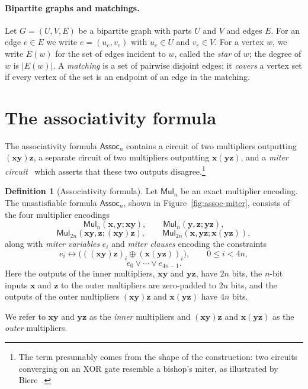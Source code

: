 \documentclass[11pt]{article}
\theoremstyle{definition}
\newtheorem{definition}[theorem]{Definition}
\theoremstyle{remark}
\newcommand{\Assoc}{\mathsf{Assoc}}
\newcommand{\Mul}{\mathsf{Mul}}
\newcommand{\vv}[1]{\mathbf{#1}}
\begin{document}
\paragraph{Bipartite graphs and matchings.}
Let $G=(U,V,E)$ be a bipartite graph with parts $U$ and $V$ and edges $E$. For an edge $e\in E$ we write $e=(u_e,v_e)$ with $u_e\in U$ and $v_e\in V$. For a vertex $w$, we write $E(w)$ for the set of edges incident to $w$, called the \emph{star} of $w$;
the degree of $w$ is $|E(w)|$. A \emph{matching} is a set of pairwise disjoint edges; it \emph{covers} a vertex set if every vertex of the
set is an endpoint of an edge in the matching.

\section{The associativity formula}
\label{sec:assoc-formula}

The associativity formula $\Assoc_n$ contains a circuit of two multipliers outputting $(\vv{x}\vv{y})\vv{z}$, a separate circuit of two multipliers outputting $\vv{x}(\vv{y}\vv{z})$, and a \emph{miter circuit}~\cite{brand93} which asserts that these two outputs disagree.\footnote{The term presumably comes from the shape of the construction: two circuits converging on an XOR gate resemble a bishop's miter, as illustrated by Biere~\cite[slide~36]{biere-fields}.}

\begin{definition}[Associativity formula]
\label{def:assoc}
Let $\Mul_n$ be an exact multiplier encoding. The unsatisfiable formula $\Assoc_n$, shown in Figure~\ref{fig:assoc-miter}, consists of the four multiplier encodings
\[
\Mul_n(\vv{x},\vv{y};\vv{x}\vv{y}),\qquad \Mul_n(\vv{y},\vv{z};\vv{y}\vv{z}),
\]
\[
\Mul_{2n}(\vv{x}\vv{y},\vv{z};(\vv{x}\vv{y})\vv{z}),\qquad \Mul_{2n}(\vv{x},\vv{y}\vv{z};\vv{x}(\vv{y}\vv{z})),
\]
along with \emph{miter variables} $e_i$ and \emph{miter clauses} encoding the constraints
\[
e_i\leftrightarrow \bigl(((\vv{x}\vv{y})\vv{z})_i\oplus(\vv{x}(\vv{y}\vv{z}))_i\bigr),\qquad 0\le i<4n,
\]
\[
e_0\vee\cdots\vee e_{4n-1}.
\]
Here the outputs of the inner multipliers, $\vv{x}\vv{y}$ and $\vv{y}\vv{z}$, have $2n$ bits, the $n$-bit inputs $\vv{x}$ and $\vv{z}$ to the outer multipliers are zero-padded to $2n$ bits, and the outputs of the outer multipliers $(\vv{x}\vv{y})\vv{z}$ and $\vv{x}(\vv{y}\vv{z})$ have $4n$ bits.

We refer to $\vv{x}\vv{y}$ and $\vv{y}\vv{z}$ as the
\emph{inner} multipliers and $(\vv{x}\vv{y})\vv{z}$ and $\vv{x}(\vv{y}\vv{z})$ as the \emph{outer} multipliers.
\end{definition}
\end{document}
